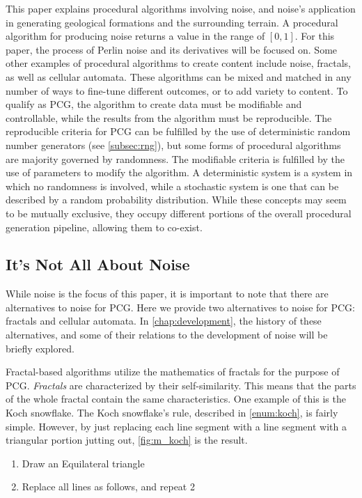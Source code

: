 \documentclass[10pt]{report}
\begin{document}
		This paper explains procedural algorithms involving noise, and noise's application in generating geological formations and the surrounding terrain. A procedural algorithm for producing noise returns a value in the range of \([0,1]\). For this paper, the process of Perlin noise and its derivatives will be focused on. Some other examples of procedural algorithms to create content include noise, fractals, as well as cellular automata. These algorithms can be mixed and matched in any number of ways to fine-tune different outcomes, or to add variety to content. To qualify as PCG, the algorithm to create data must be modifiable and controllable, while the results from the algorithm must be reproducible. The reproducible criteria for PCG can be fulfilled by the use of deterministic random number generators (see \autoref{subsec:rng}), but some forms of procedural algorithms are majority governed by randomness. The modifiable criteria is fulfilled by the use of parameters to modify the algorithm. A deterministic system is a system in which no randomness is involved, while a stochastic system is one that can be described by a random probability distribution. While these concepts may seem to be mutually exclusive, they occupy different portions of the overall procedural generation pipeline, allowing them to co-exist. 
		
		\subsection{It's Not All About Noise}
		
		While noise is the focus of this paper, it is important to note that there are alternatives to noise for PCG. Here we provide two alternatives to noise for PCG: fractals and cellular automata. In \autoref{chap:development}, the history of these alternatives, and some of their relations to the development of noise will be briefly explored. 
		
		Fractal-based algorithms utilize the mathematics of fractals for the purpose of PCG. \emph{Fractals} are characterized by their self-similarity. This means that the parts of the whole fractal contain the same characteristics. One example of this is the Koch snowflake. The Koch snowflake's rule, described in \autoref{enum:koch}, is fairly simple. However, by just replacing each line segment with a line segment with a triangular portion jutting out, \autoref{fig:m_koch} is the result.
		
		\begin{enumerate} \label{enum:koch}
			\item Draw an Equilateral triangle
			\item Replace all lines as follows, and repeat 2
		\end{enumerate}
		
\end{document}
